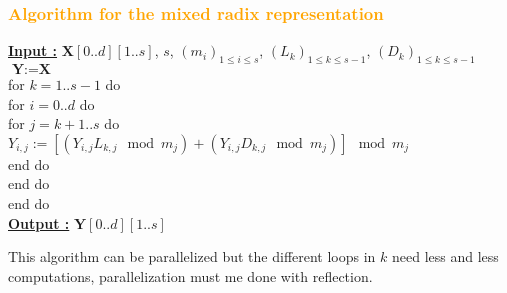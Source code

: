 \begin{frame}[fragile]
\frametitle{\textbf{\textcolor{orange}{Algorithm for the mixed radix representation}}}

\begin{block}{}
\underline{\textbf{Input :}} $\textbf{X}[0..d][1..s]$, $s$, $(m_i)_{1\leq i \leq s}$, $(L_k)_{1 \leq k \leq s-1}$, $(D_k)_{1 \leq k \leq s-1}$ \\
$\textbf{Y} := \textbf{X}$\\
for $k = 1..s-1$ do \\
\hspace{4mm}for $i = 0..d$ do \\
\hspace{8mm}for $j = k+1..s$ do \\
\hspace{12mm}$Y_{i,j} := \left[ \left( Y_{i,j}L_{k,j}\mod m_j \right) + \left( Y_{i,j}D_{k,j}\mod m_j \right) \right]\mod m_j$ \\
\hspace{8mm}end do \\
\hspace{4mm}end do \\
end do \\
\underline{\textbf{Output :}} $\textbf{Y}[0..d][1..s]$
\end{block}


This algorithm can be parallelized but the different loops in $k$ need less and less computations, parallelization must me done with reflection.

\end{frame}
